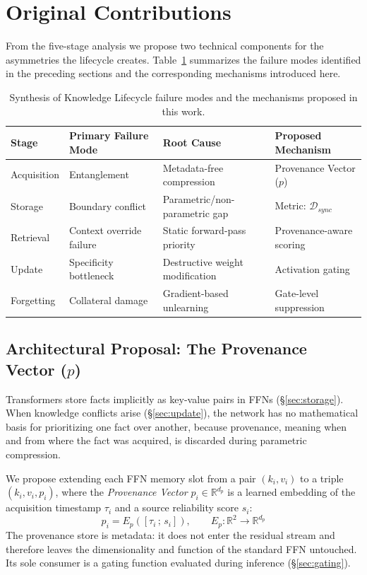 \documentclass[10pt]{article}
\begin{document}
\section{Original Contributions}
\label{sec:contributions}

From the five-stage analysis we propose two technical components for the asymmetries the lifecycle creates. Table~\ref{tab:synthesis} summarizes the failure modes identified in the preceding sections and the corresponding mechanisms introduced here.

\begin{table}[h]
\centering
\caption{Synthesis of Knowledge Lifecycle failure modes and the mechanisms proposed in this work.}
\label{tab:synthesis}
\small
\begin{tabular}{@{}llll@{}}
\toprule
\textbf{Stage} & \textbf{Primary Failure Mode} & \textbf{Root Cause} & \textbf{Proposed Mechanism} \\ \midrule
Acquisition & Entanglement & Metadata-free compression & Provenance Vector ($p$) \\
Storage & Boundary conflict & Parametric/non-parametric gap & Metric: $\mathcal{D}_{sync}$ \\
Retrieval & Context override failure & Static forward-pass priority & Provenance-aware scoring \\
Update & Specificity bottleneck & Destructive weight modification & Activation gating \\
Forgetting & Collateral damage & Gradient-based unlearning & Gate-level suppression \\ \bottomrule
\end{tabular}
\end{table}

\subsection{Architectural Proposal: The Provenance Vector (\texorpdfstring{$p$}{p})}
\label{sec:provenance}

Transformers store facts implicitly as key-value pairs in FFNs (\S\ref{sec:storage}). When knowledge conflicts arise (\S\ref{sec:update}), the network has no mathematical basis for prioritizing one fact over another, because provenance, meaning when and from where the fact was acquired, is discarded during parametric compression.

We propose extending each FFN memory slot from a pair $(k_i, v_i)$ to a triple $(k_i, v_i, p_i)$, where the \textit{Provenance Vector} $p_i \in \mathbb{R}^{d_p}$ is a learned embedding of the acquisition timestamp $\tau_i$ and a source reliability score $s_i$:
\begin{equation}
  p_i = E_p([\tau_i \,;\, s_i]), \qquad E_p : \mathbb{R}^2 \to \mathbb{R}^{d_p}
\end{equation}
The provenance store is metadata: it does not enter the residual stream and therefore leaves the dimensionality and function of the standard FFN untouched. Its sole consumer is a gating function evaluated during inference (\S\ref{sec:gating}).
\end{document}
